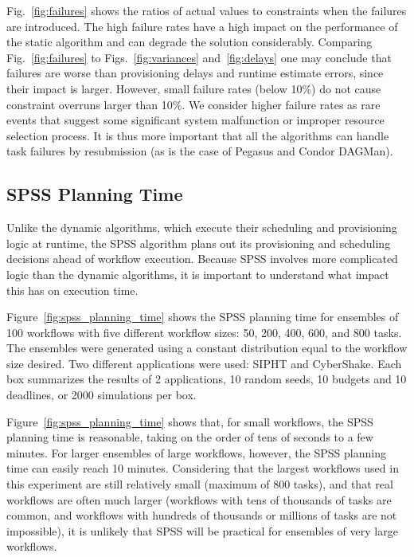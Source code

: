 \documentclass[conference]{IEEEtran}
\begin{document}
Fig.~\ref{fig:failures} shows the ratios of actual values to constraints when
the failures are introduced. The high failure rates have a high impact on the
performance of the static algorithm and can degrade the solution considerably.
Comparing Fig.~\ref{fig:failures} to Figs.~\ref{fig:variances}
and~\ref{fig:delays} one may conclude that failures are worse than
provisioning delays and runtime estimate errors, since their impact is larger.
However, small failure rates (below 10\%) do not cause constraint overruns
larger than 10\%. We consider higher failure rates as rare events that suggest
some significant system malfunction or improper resource selection
process. It is thus more important that all the algorithms can handle task
failures by resubmission (as is the case of Pegasus and Condor DAGMan).



\subsection{SPSS Planning Time}

Unlike the dynamic algorithms, which execute their scheduling and provisioning logic at runtime, the SPSS algorithm plans out its provisioning and scheduling decisions ahead of workflow execution. Because SPSS involves more complicated logic than the dynamic algorithms, it is important to understand what impact this has on execution time.

Figure~\ref{fig:spss_planning_time} shows the SPSS planning time for ensembles of 100 workflows with five different workflow sizes: 50, 200, 400, 600, and 800 tasks. The ensembles were generated using a constant distribution equal to the workflow size desired. Two different applications were used: SIPHT and CyberShake. Each box summarizes the results of 2 applications, 10 random seeds, 10 budgets and 10 deadlines, or 2000 simulations per box.

Figure~\ref{fig:spss_planning_time} shows that, for small workflows, the SPSS planning time is reasonable, taking on the order of tens of seconds to a few minutes. For larger ensembles of large workflows, however, the SPSS planning time can easily reach 10 minutes. Considering that the largest workflows used in this experiment are still relatively small (maximum of 800 tasks), and that real workflows are often much larger (workflows with tens of thousands of tasks are common, and workflows with hundreds of thousands or millions of tasks are not impossible), it is unlikely that SPSS will be practical for ensembles of very large workflows.
\end{document}
